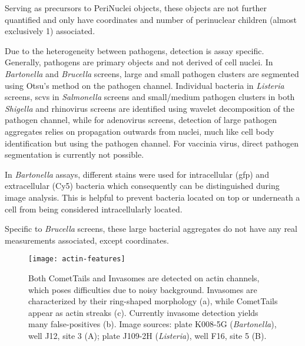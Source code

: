 \begin{description}[leftmargin=0.5cm]
\item[ExpandedNuclei:] Serving as precursors to PeriNuclei objects, these objects are not further quantified and only have coordinates and number of perinuclear children (almost exclusively 1) associated.
\item[Bacteria/Viruses/Pathogen:] Due to the heterogeneity between pathogens, detection is assay specific. Generally, pathogens are primary objects and not derived of cell nuclei. In \textit{Bartonella} and \textit{Brucella} screens, large and small pathogen clusters are segmented using Otsu's method on the pathogen channel. Individual bacteria in \textit{Listeria} screens, \glspl{scv} in \textit{Salmonella} screens and small\slash medium pathogen clusters in both \textit{Shigella} and rhinovirus screens are identified using wavelet decomposition of the pathogen channel, while for adenovirus screens, detection of large pathogen aggregates relies on propagation outwards from nuclei, much like cell body identification but using the pathogen channel. For vaccinia virus, direct pathogen segmentation is currently not possible.
\item[IntBacteria/ExtBacteria:] In \textit{Bartonella} assays, different stains were used for intracellular (\acrshort{gfp}) and extracellular (Cy5) bacteria which consequently can be distinguished during image analysis. This is helpful to prevent bacteria located on top or underneath a cell from being considered intracellularly located.
\item[BlobBacteria:] Specific to \textit{Brucella} screens, these large bacterial aggregates do not have any real measurements associated, except coordinates.

\begin{figure}
  \centering
  \texttt{[image: actin-features]}
  \caption[Detection of two actin based structures, CometTails and Invasomes.]{Both CometTails and Invasomes are detected on actin channels, which poses difficulties due to noisy background. Invasomes are characterized by their ring-shaped morphology (a), while CometTails appear as actin streaks (c). Currently invasome detection yields many false-positives (b). Image sources: plate K008-5G (\textit{Bartonella}), well J12, site 3 (A); plate J109-2H (\textit{Listeria}), well F16, site 5 (B).}
  \label{fig:actin-features}
\end{figure}


\end{description}
